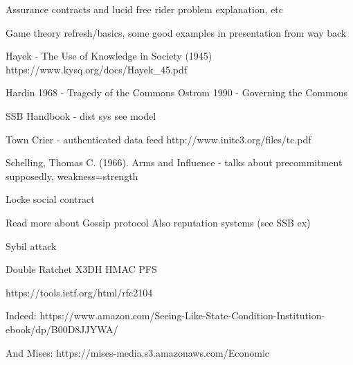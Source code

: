 \documentclass[12pt]{report}
\begin{document}
Assurance contracts and lucid free rider problem explanation, etc

Game theory refresh/basics, some good examples in presentation from way back

Hayek - The Use of Knowledge in Society (1945) https://www.kysq.org/docs/Hayek_45.pdf

Hardin 1968 - Tragedy of the Commons
Ostrom 1990 - Governing the Commons

SSB Handbook - dist sys see model

Town Crier - authenticated data feed http://www.initc3.org/files/tc.pdf

Schelling, Thomas C. (1966). Arms and Influence - talks about precommitment supposedly, weakness=strength

Locke social contract

Read more about Gossip protocol
Also reputation systems (see SSB ex)

Sybil attack

Double Ratchet X3DH HMAC PFS

https://tools.ietf.org/html/rfc2104

Indeed: https://www.amazon.com/Seeing-Like-State-Condition-Institution-ebook/dp/B00D8JJYWA/

And Mises: https://mises-media.s3.amazonaws.com/Economic%
\end{document}
